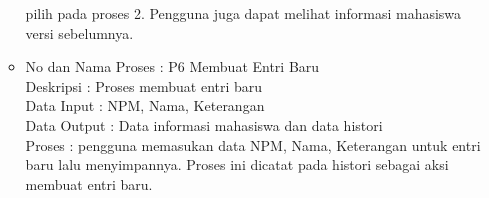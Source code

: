 \begin{enumerate}[(1)]
\begin{itemize}
  pilih pada proses 2. Pengguna juga dapat melihat informasi mahasiswa versi
  sebelumnya.
  \item No dan Nama Proses : P6 Membuat Entri Baru\\
  Deskripsi : Proses membuat entri baru\\
  Data Input : NPM, Nama, Keterangan\\
  Data Output : Data informasi mahasiswa dan data histori\\
  Proses : pengguna memasukan data NPM, Nama, Keterangan untuk entri baru lalu
  menyimpannya. Proses ini dicatat pada histori sebagai aksi membuat entri baru.
\end{itemize}  
\end{enumerate}